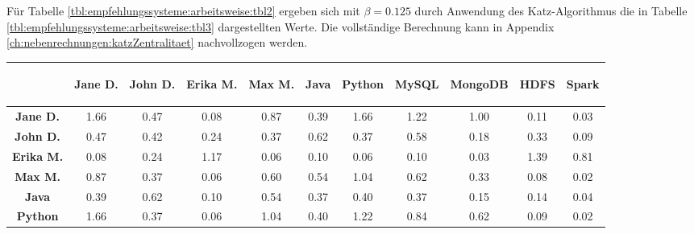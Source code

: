 Für Tabelle \ref{tbl:empfehlungssysteme:arbeitsweise:tbl2} ergeben sich mit $\beta = 0.125$ durch Anwendung des Katz-Algorithmus die in Tabelle \ref{tbl:empfehlungssysteme:arbeitsweise:tbl3} dargestellten Werte. Die vollständige Berechnung kann in Appendix \ref{ch:nebenrechnungen:katzZentralitaet} nachvollzogen werden.

\begin{table}[h]
	\centering
	\begin{tabular}{c|c|c|c|c|c|c|c|c|c|c}
		& \begin{sideways}\textbf{Jane D.}\end{sideways} & \begin{sideways}\textbf{John D.}\end{sideways} & \begin{sideways}\textbf{Erika M.}\end{sideways} & \begin{sideways}\textbf{Max M.}\end{sideways} & \begin{sideways}\textbf{Java}\end{sideways} & \begin{sideways}\textbf{Python}\end{sideways} & \begin{sideways}\textbf{MySQL}\end{sideways} & \begin{sideways}\textbf{MongoDB}\end{sideways} & \begin{sideways}\textbf{HDFS}\end{sideways} & \begin{sideways}\textbf{Spark}\end{sideways} \\ 
		\hline
		\textbf{Jane D.}  & 1.66 & 0.47 & 0.08 & 0.87 & 0.39 & 1.66 & 1.22 & 1.00 & 0.11 & 0.03\\
		\textbf{John D.}  & 0.47 & 0.42 & 0.24 & 0.37 & 0.62 & 0.37 & 0.58 & 0.18 & 0.33 & 0.09\\
		\textbf{Erika M.} & 0.08 & 0.24 & 1.17 & 0.06 & 0.10 & 0.06 & 0.10 & 0.03 & 1.39 & 0.81\\
		\textbf{Max M.}   & 0.87 & 0.37 & 0.06 & 0.60 & 0.54 & 1.04 & 0.62 & 0.33 & 0.08 & 0.02\\
		\textbf{Java}     & 0.39 & 0.62 & 0.10 & 0.54 & 0.37 & 0.40 & 0.37 & 0.15 & 0.14 & 0.04\\
		\textbf{Python}   & 1.66 & 0.37 & 0.06 & 1.04 & 0.40 & 1.22 & 0.84 & 0.62 & 0.09 & 0.02\\

\end{tabular}
\end{table}

